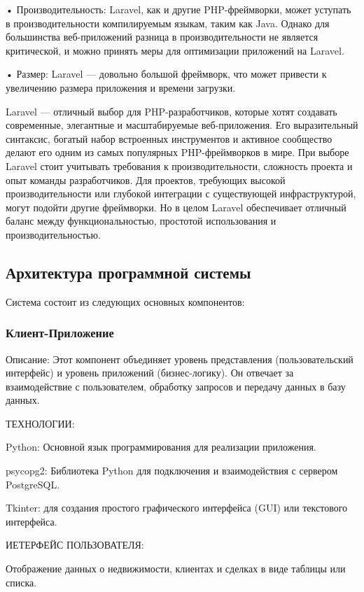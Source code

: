 •	Производительность: Laravel, как и другие PHP-фреймворки, может уступать в производительности компилируемым языкам, таким как Java. Однако для большинства веб-приложений разница в производительности не является критической, и можно принять меры для оптимизации приложений на Laravel.

•	Размер: Laravel — довольно большой фреймворк, что может привести к увеличению размера приложения и времени загрузки.

Laravel — отличный выбор для PHP-разработчиков, которые хотят создавать современные, элегантные и масштабируемые веб-приложения. Его выразительный синтаксис, богатый набор встроенных инструментов и активное сообщество делают его одним из самых популярных PHP-фреймворков в мире. При выборе Laravel стоит учитывать требования к производительности, сложность проекта и опыт команды разработчиков. Для проектов, требующих высокой производительности или глубокой интеграции с существующей инфраструктурой, могут подойти другие фреймворки. Но в целом Laravel обеспечивает отличный баланс между функциональностью, простотой использования и производительностью.


\subsection{Архитектура программной системы}

Система состоит из следующих основных компонентов:

\subsubsection{Клиент-Приложение}

Описание: Этот компонент объединяет уровень представления (пользовательский интерфейс) и уровень приложений (бизнес-логику). Он отвечает за взаимодействие с пользователем, обработку запросов и передачу данных в базу данных.

ТЕХНОЛОГИИ:

Python: Основной язык программирования для реализации приложения.

psycopg2: Библиотека Python для подключения и взаимодействия с сервером PostgreSQL.

Tkinter: для создания простого графического интерфейса (GUI) или текстового интерфейса. 

ИЕТЕРФЕЙС ПОЛЬЗОВАТЕЛЯ:

Отображение данных о недвижимости, клиентах и сделках в виде таблицы или списка.

